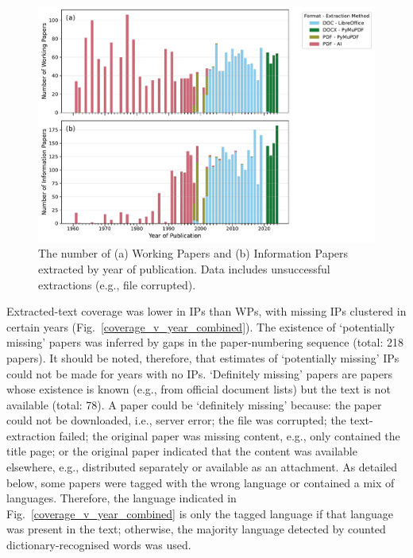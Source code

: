 \documentclass[12pt]{article}
\begin{document}
\begin{figure}[h]
    \includegraphics[width=\textwidth]{../results_describe_data/extraction_method_v_year_combined.pdf}
    \caption{
        The number of (a) Working Papers and (b) Information Papers
        extracted by year of publication.
        Data includes unsuccessful extractions (e.g., file corrupted).
    } \label{extraction_method_v_year_combined}
\end{figure}

\newpage
Extracted-text coverage was lower in IPs than WPs,
with missing IPs clustered in certain years
(Fig.~\ref{coverage_v_year_combined}).
The existence of `potentially missing' papers was
inferred by gaps in the paper-numbering sequence
(total: 218 papers).
It should be noted, therefore,
that estimates of `potentially missing' IPs could 
not be made for years with no IPs.
`Definitely missing' papers are papers whose existence is known
(e.g., from official document lists)
but the text is not available (total: 78).
A paper could be `definitely missing'
because: 
the paper could not be downloaded, i.e., server error;
the file was corrupted; 
the text-extraction failed;
the original paper was missing content, e.g., only contained the title page;
or the original paper indicated that the content was available elsewhere,
e.g., distributed separately or available as an attachment.
As detailed below,
some papers were tagged with the wrong language
or contained a mix of languages.
Therefore,
the language indicated in Fig.~\ref{coverage_v_year_combined} 
is only the tagged language if that language was present in the text;
otherwise, the majority language detected by counted dictionary-recognised words was used.
\end{document}
